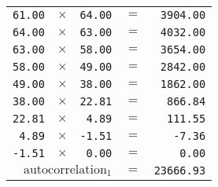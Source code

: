 {\begin{multicols}{2}
\begin{tabular}{rrrrr}
  \texttt{61.00} & $\times$ & \texttt{64.00} & $=$ & \texttt{3904.00} \\
  \texttt{64.00} & $\times$ & \texttt{63.00} & $=$ & \texttt{4032.00} \\
  \texttt{63.00} & $\times$ & \texttt{58.00} & $=$ & \texttt{3654.00} \\
  \texttt{58.00} & $\times$ & \texttt{49.00} & $=$ & \texttt{2842.00} \\
  \texttt{49.00} & $\times$ & \texttt{38.00} & $=$ & \texttt{1862.00} \\
  \texttt{38.00} & $\times$ & \texttt{22.81} & $=$ & \texttt{866.84} \\
  \texttt{22.81} & $\times$ & \texttt{4.89} & $=$ & \texttt{111.55} \\
  \texttt{4.89} & $\times$ & \texttt{-1.51} & $=$ & \texttt{-7.36} \\
  \texttt{-1.51} & $\times$ & \texttt{0.00} & $=$ & \texttt{0.00} \\
  \hline
  \multicolumn{3}{r}{$\text{autocorrelation}_1$} & $=$ & \texttt{23666.93} \\
\end{tabular}


\end{multicols}}
